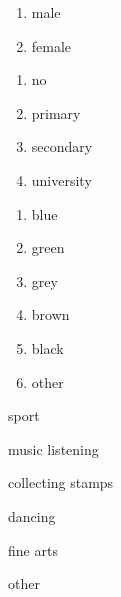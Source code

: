 \documentclass[10pt,a5paper,fleqn]{scrreprt}
\begin{document}
\small


 \xxxbox


\begin{enumerate}
\item male
\item female
\end{enumerate}

\xxbox


\begin{enumerate}
\item no
\item primary
\item secondary
\item university
\end{enumerate}


\xxxbox

\xxxbox


\begin{enumerate}
\item blue
\item green
\item grey
\item brown
\item black
\item other%
\end{enumerate}


\hspace*{-1em}
\begin{answersB}
\item sport
\item music listening
\item collecting stamps
\item dancing
\item fine arts
\item other%
\end{answersB}
\vfill
\end{document}
